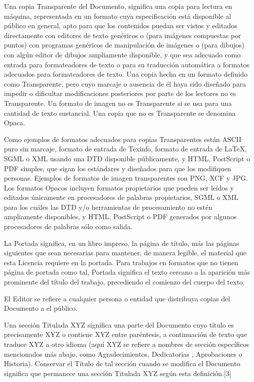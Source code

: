 \documentclass[a4paper, 11pt, oneside]{report}
\begin{document}
Una copia Transparente del Documento, significa una copia para lectura en máquina, representada en un formato cuya especificación está disponible al público en general, apto para que los contenidos puedan ser vistos y editados directamente con editores de texto genéricos o (para imágenes compuestas por puntos) con programas genéricos de manipulación de imágenes o (para dibujos) con algún editor de dibujos ampliamente disponible, y que sea adecuado como entrada para formateadores de texto o para su traducción automática a formatos adecuados para formateadores de texto. Una copia hecha en un formato definido como Transparente, pero cuyo marcaje o ausencia de él haya sido diseñado para impedir o dificultar modificaciones posteriores por parte de los lectores no es Transparente. Un formato de imagen no es Transparente si se usa para una cantidad de texto sustancial. Una copia que no es Transparente se denomina Opaca.

Como ejemplos de formatos adecuados para copias Transparentes están ASCII puro sin marcaje, formato de entrada de Texinfo, formato de entrada de LaTeX, SGML o XML usando una DTD disponible públicamente, y HTML, PostScript o PDF simples, que sigan los estándares y diseñados para que los modifiquen personas. Ejemplos de formatos de imagen transparentes son PNG, XCF y JPG. Los formatos Opacos incluyen formatos propietarios que pueden ser leídos y editados únicamente en procesadores de palabras propietarios, SGML o XML para los cuáles las DTD y/o herramientas de procesamiento no estén ampliamente disponibles, y HTML, PostScript o PDF generados por algunos procesadores de palabras sólo como salida.

La Portada significa, en un libro impreso, la página de título, más las páginas siguientes que sean necesarias para mantener, de manera legible, el material que esta Licencia requiere en la portada. Para trabajos en formatos que no tienen página de portada como tal, Portada significa el texto cercano a la aparición más prominente del título del trabajo, precediendo el comienzo del cuerpo del texto.

El Editor se refiere a cualquier persona o entidad que distribuya copias del Documento a el público.

Una sección Titulada XYZ significa una parte del Documento cuyo título es precisamente XYZ o contiene XYZ entre paréntesis, a continuación de texto que traduce XYZ a otro idioma (aquí XYZ se refiere a nombres de sección específicos mencionados más abajo, como Agradecimientos, Dedicatorias , Aprobaciones o Historia). Conservar el Título de tal sección cuando se modifica el Documento significa que permanece una sección Titulada XYZ según esta definición.[3]
\end{document}
